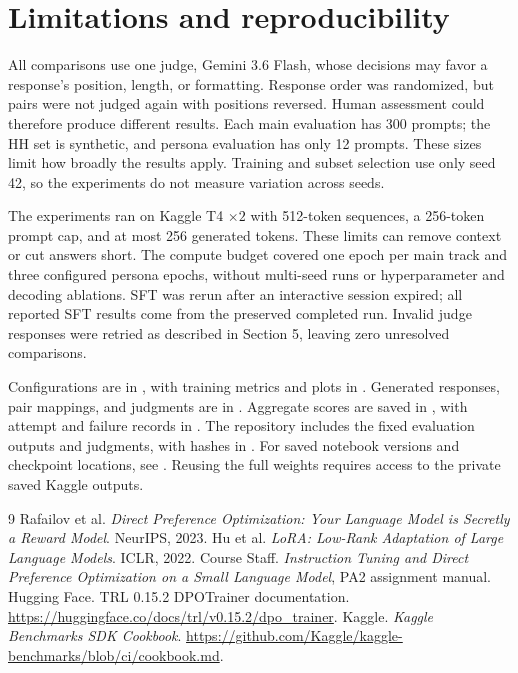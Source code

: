 \documentclass[10pt,a4paper]{article}
\begin{document}
\clearpage
\section{Limitations and reproducibility}
All comparisons use one judge, Gemini 3.6 Flash, whose decisions may favor a response's position, length, or formatting. Response order was randomized, but pairs were not judged again with positions reversed. Human assessment could therefore produce different results. Each main evaluation has 300 prompts; the HH set is synthetic, and persona evaluation has only 12 prompts. These sizes limit how broadly the results apply. Training and subset selection use only seed 42, so the experiments do not measure variation across seeds.

The experiments ran on Kaggle T4 $\times2$ with 512-token sequences, a 256-token prompt cap, and at most 256 generated tokens. These limits can remove context or cut answers short. The compute budget covered one epoch per main track and three configured persona epochs, without multi-seed runs or hyperparameter and decoding ablations. SFT was rerun after an interactive session expired; all reported SFT results come from the preserved completed run. Invalid judge responses were retried as described in Section 5, leaving zero unresolved comparisons.

\begin{sloppypar}
Configurations are in , with training metrics and plots in . Generated responses, pair mappings, and judgments are in . Aggregate scores are saved in , with attempt and failure records in . The repository includes the fixed evaluation outputs and judgments, with hashes in . For saved notebook versions and checkpoint locations, see . Reusing the full weights requires access to the private saved Kaggle outputs.
\end{sloppypar}

\begingroup\footnotesize
\setlength{\parskip}{0pt}
\begin{thebibliography}{9}\setlength{\itemsep}{0pt}
 Rafailov et al. \emph{Direct Preference Optimization: Your Language Model is Secretly a Reward Model}. NeurIPS, 2023.
 Hu et al. \emph{LoRA: Low-Rank Adaptation of Large Language Models}. ICLR, 2022.
 Course Staff. \emph{Instruction Tuning and Direct Preference Optimization on a Small Language Model}, PA2 assignment manual.
 Hugging Face. TRL 0.15.2 DPOTrainer documentation. \url{https://huggingface.co/docs/trl/v0.15.2/dpo_trainer}.
 Kaggle. \emph{Kaggle Benchmarks SDK Cookbook}. \url{https://github.com/Kaggle/kaggle-benchmarks/blob/ci/cookbook.md}.
\end{thebibliography}
\endgroup
\end{document}

